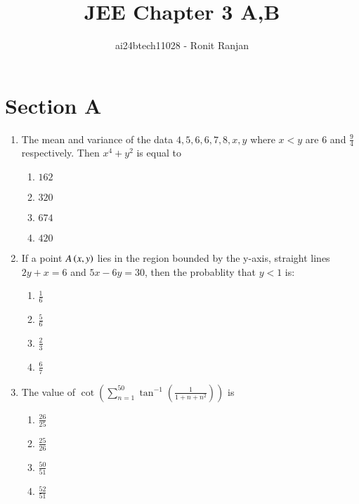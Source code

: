 \documentclass[journal,12pt,twocolumn]{IEEEtran}
\theoremstyle{remark}
\begin{document}

\vspace{3cm}

\title{JEE Chapter 3 A,B}
\author{ai24btech11028 - Ronit Ranjan}
\maketitle
\newpage
\bigskip

\section*{Section A}

\begin{enumerate}
    \item The mean and variance of the data $4, 5, 6, 6, 7, 8, x, y$ where $x < y$ are $6$ and $\frac{9}{4}$ respectively. Then $x^4 + y^2$ is equal to 
    \begin{multicols}{2}
    \begin{enumerate}
        \item $162$
        \item $320$
        \item $674$
        \item $420$
    \end{enumerate}
    \end{multicols}

    \item If a point $A\left(x, y\right)$ lies in the region bounded by the y-axis, straight lines $2y + x = 6$ and $5x - 6y = 30$, then the probablity that $y<1$ is:
    \begin{multicols}{2}
    \begin{enumerate}
        \item $\frac{1}{6}$
        \item $\frac{5}{6}$
        \item $\frac{2}{3}$
        \item $\frac{6}{7}$
    \end{enumerate}
    \end{multicols}    

    \item The value of $\cot \left( \sum_{n=1}^{50} \tan^{-1} \left( \frac{1}{1+n+n^2} \right) \right)$ is  
    \begin{multicols}{2}
    \begin{enumerate}
        \item $\frac{26}{25}$
        \item $\frac{25}{26}$
        \item $\frac{50}{51}$
        \item $\frac{52}{51}$
    \end{enumerate}
    \end{multicols}    


\end{enumerate}
\end{document}
